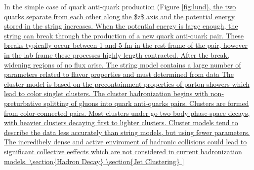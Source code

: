 In the simple case of quark anti-quark production (Figure \ref{fig:lund), the two quarks separate from each other along the $z$ axis and the potential energy stored in the 
string increases. When the potential energy is large enough, the string can break through the production of a new quark anti-quark pair. These breaks 
typically occur between 1 and 5 fm in the rest frame of the pair, however in the lab frame these processes highly length contracted. After the break,
widening regions of no flux arise. 

The string model contains a large number of parameters related to flavor properties and must determined from data

The cluster model is based on the precontainment properties of parton showers which lead to  color singlet clusters. The cluster hadronization begins with
non-preturbative splitting of gluons into quark anti-quarks pairs. Clusters are formed from color-connected pairs. Most clusters under go two body phase-space decays, 
with heavier clusters decaying first to lighter clusters. Cluster models tend to describe the data less accurately than 
string models, but using fewer parameters.

The incredibely dense and active enviroment of hadronic collisions could lead to significant collective eeffects which are not considered in current 
hadronization models.



\section{Hadron Decay} 

\section{Jet Clustering}

}
